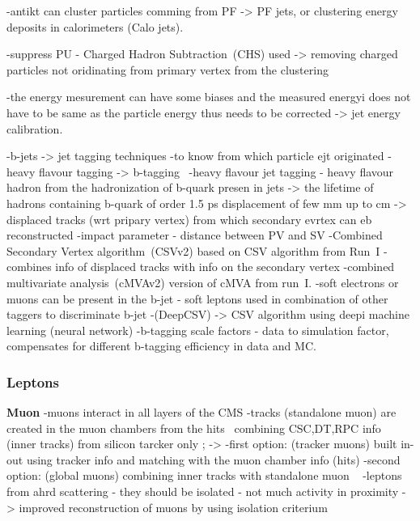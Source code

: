 -antikt can cluster particles comming from PF -> PF jets, or clustering energy deposits in calorimeters (Calo jets).

-suppress PU  - Charged Hadron Subtraction~(CHS) used -> removing charged particles not oridinating from primary vertex from the clustering

-the energy mesurement can have some biases and the measured energyi does not have to be same as the particle energy thus needs to be corrected -> jet energy calibration.

-b-jets -> jet tagging techniques
-to know from which particle ejt originated
-heavy flavour tagging -> b-tagging~\cite{Sirunyan:2017ezt}
-heavy flavour jet tagging - heavy flavour hadron from the hadronization of b-quark presen in jets -> the lifetime of hadrons containing b-quark of order 1.5 ps displacement of few mm up to cm -> displaced tracks (wrt pripary vertex) from which secondary evrtex can eb reconstructed
-impact parameter - distance between PV and SV
-Combined Secondary Vertex algorithm~(CSVv2) based on CSV algorithm from Run~I
	-combines info of displaced tracks with info on the secondary vertex
-combined multivariate analysis~(cMVAv2) version of cMVA from run~I.
	-soft electrons or muons can be  present in the b-jet - soft leptons used in combination of other taggers to discriminate b-jet
-(DeepCSV) -> CSV algorithm using deepi machine learning (neural network)
-b-tagging scale factors - data to simulation factor, compensates for different b-tagging efficiency in data and MC.

\subsubsection{Leptons}

\textbf{Muon}
-muons interact in all layers of the CMS
-tracks (standalone muon) are created in the muon chambers from the hits ~combining CSC,DT,RPC info 
(inner tracks) from silicon tarcker only ; -> 
-first option: (tracker muons) built in-out using tracker info and matching with the muon chamber info (hits)
-second option: (global muons) combining inner tracks with standalone muon
~\cite{Chatrchyan:2012xi}
-leptons from ahrd scattering - they should be isolated - not much activity in proximity -> improved reconstruction of muons by using isolation criterium

